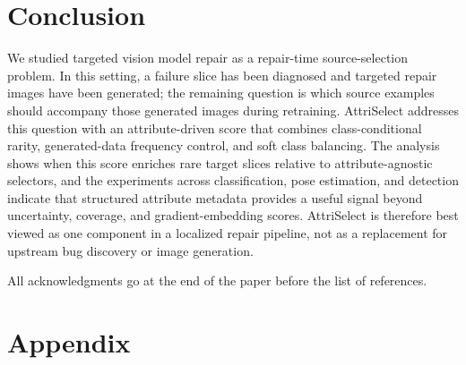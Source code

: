 \documentclass{article}
\newcommand{\model}{AttriSelect\xspace}
\begin{document}

\section{Conclusion}

We studied targeted vision model repair as a repair-time source-selection problem. In this setting, a failure slice has been diagnosed and targeted repair images have been generated; the remaining question is which source examples should accompany those generated images during retraining. \model addresses this question with an attribute-driven score that combines class-conditional rarity, generated-data frequency control, and soft class balancing. The analysis shows when this score enriches rare target slices relative to attribute-agnostic selectors, and the experiments across classification, pose estimation, and detection indicate that structured attribute metadata provides a useful signal beyond uncertainty, coverage, and gradient-embedding scores. \model is therefore best viewed as one component in a localized repair pipeline, not as a replacement for upstream bug discovery or image generation.

\begin{ack}
All acknowledgments go at the end of the paper before the list of references.
\end{ack}




\appendix

\section*{Appendix}
\end{document}
